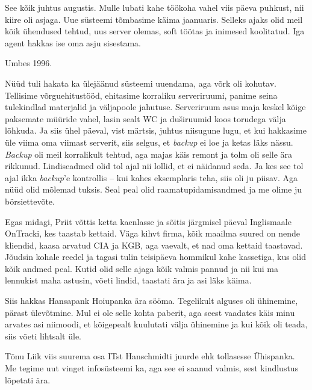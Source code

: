 See kõik juhtus augustis. Mulle lubati kahe töökoha vahel viis päeva puhkust, 
nii kiire oli asjaga. Uue süsteemi tõmbasime käima jaanuaris. Selleks 
ajaks olid meil kõik ühendused tehtud, uus server olemas, 
soft töötas ja inimesed koolitatud. Iga agent hakkas ise oma asju sisestama.


Umbes 1996. 

Nüüd tuli hakata ka ülejäänud süsteemi uuendama, aga võrk oli kohutav. 
Tellisime võrguehitustööd, ehitasime korraliku serveriruumi, panime seina
tulekindlad materjalid ja väljapoole jahutuse. Serveriruum asus maja keskel kõige paksemate 
müüride vahel, lasin sealt WC ja duširuumid koos torudega välja 
lõhkuda. Ja siis ühel päeval, vist märtsis, juhtus niisugune lugu, et kui 
hakkasime üle viima oma viimast serverit, siis
selgus, et \emph{backup} ei loe ja ketas läks nässu. \emph{Backup} oli meil 
korralikult tehtud, aga majas käis remont ja tolm oli selle ära rikkunud. 
Lindiseadmed olid tol ajal nii lollid, et ei näidanud seda. Ja kes see tol ajal ikka
\emph{backup}'e kontrollis -- kui kahes eksemplaris teha, siis oli ju piisav. Aga nüüd olid mõlemad tuksis. Seal peal olid raamatupidamisandmed ja me olime ju 
börsiettevõte. 

Egas midagi, Priit võttis ketta kaenlasse ja sõitis järgmisel päeval Inglismaale OnTracki, kes taastab kettaid. Väga kihvt firma, kõik maailma 
suured on nende kliendid, kaasa arvatud CIA ja KGB, aga vaevalt, et nad oma 
kettaid taastavad. Jõudsin kohale reedel ja tagasi tulin teisipäeva hommikul 
kahe kassetiga, kus olid kõik andmed peal. Kutid olid selle ajaga kõik 
valmis pannud ja nii kui ma lennukist maha astusin, võeti lindid, taastati 
ära ja asi läks käima.

Siis hakkas Hansapank Hoiupanka ära sööma. Tegelikult alguses oli ühinemine, 
pärast ülevõtmine. Mul ei ole selle kohta paberit, aga seest 
vaadates käis minu arvates asi niimoodi, et kõigepealt kuulutati välja ühinemine ja kui kõik 
oli teada, siis võeti lihtsalt üle. 

Tõnu Liik viis suurema osa ITst 
Hanschmidti juurde ehk tollasesse Ühispanka. Me tegime uut vinget 
infosüsteemi ka, aga see ei saanud valmis, sest kindlustus lõpetati ära. 

